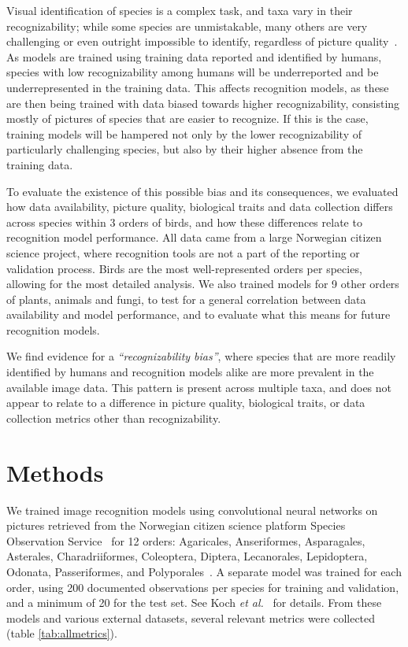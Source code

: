 \documentclass{article}
\begin{document}
Visual identification of species is a complex task, and taxa vary in their recognizability; while some species are unmistakable, many others are very challenging or even outright impossible to identify, regardless of picture quality~\cite{Lukhtanov2019}. As models are trained using training data reported and identified by humans, species with low recognizability among humans will be underreported and be underrepresented in the training data. This affects recognition models, as these are then being trained with data biased towards higher recognizability, consisting mostly of pictures of species that are easier to recognize. If this is the case, training models will be hampered not only by the lower recognizability of particularly challenging species, but also by their higher absence from the training data.

To evaluate the existence of this possible bias and its consequences, we evaluated how data availability, picture quality, biological traits and data collection differs across species within 3 orders of birds, and how these differences relate to recognition model performance. All data came from a large Norwegian citizen science project, where recognition tools are not a part of the reporting or validation process. Birds are the most well-represented orders per species, allowing for the most detailed analysis. We also trained models for 9 other orders of plants, animals and fungi, to test for a general correlation between data availability and model performance, and to evaluate what this means for future recognition models.

We find evidence for a \textit{``recognizability bias''}, where species that are more readily identified by humans and recognition models alike are more prevalent in the available image data. This pattern is present across multiple taxa, and does not appear to relate to a difference in picture quality, biological traits, or data collection metrics other than recognizability.



\section*{Methods}

We trained image recognition models using convolutional neural networks on pictures retrieved from the Norwegian citizen science platform Species Observation Service~\cite{artsobs} for 12 orders: Agaricales, Anseriformes, Asparagales, Asterales, Charadriiformes, Coleoptera, Diptera, Lecanorales, Lepidoptera, Odonata, Passeriformes, and Polyporales~\cite{GBIF}. A separate model was trained for each order, using 200 documented observations per species for training and validation, and a minimum of 20 for the test set. See Koch \textit{et al.}~\cite{Koch2022} for details. From these models and various external datasets, several relevant metrics were collected (table \ref{tab:allmetrics}).
\end{document}
